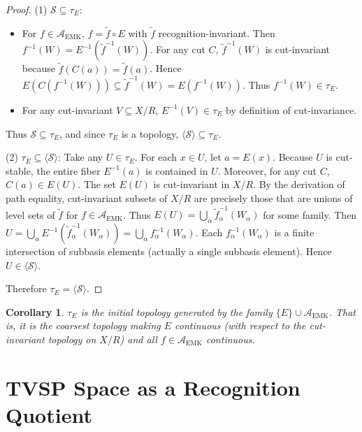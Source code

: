 \documentclass[12pt]{article}
\newtheorem{corollary}[axiom]{Corollary}
\newcommand{\EMK}{\mathrm{EMK}}
\newcommand{\A}{\mathcal{A}}
\begin{document}
\begin{proof}
(1) \(\mathcal{S} \subseteq \tau_E\):
\begin{itemize}
    \item For \(f \in \A_{\EMK}\), \(f = \tilde{f} \circ E\) with \(\tilde{f}\) recognition-invariant.
    Then \(f^{-1}(W) = E^{-1}(\tilde{f}^{-1}(W))\).
    For any cut \(C\), \(\tilde{f}^{-1}(W)\) is cut-invariant because \(\tilde{f}(C(a)) = \tilde{f}(a)\).
    Hence \(E(C(f^{-1}(W))) \subseteq \tilde{f}^{-1}(W) = E(f^{-1}(W))\).
    Thus \(f^{-1}(W) \in \tau_E\).
    \item For any cut-invariant \(V \subseteq X/R\), \(E^{-1}(V) \in \tau_E\) by definition of cut-invariance.
\end{itemize}
Thus \(\mathcal{S} \subseteq \tau_E\), and since \(\tau_E\) is a topology, \(\langle \mathcal{S} \rangle \subseteq \tau_E\).

(2) \(\tau_E \subseteq \langle \mathcal{S} \rangle\):
Take any \(U \in \tau_E\). For each \(x \in U\), let \(a = E(x)\).
Because \(U\) is cut-stable, the entire fiber \(E^{-1}(a)\) is contained in \(U\).
Moreover, for any cut \(C\), \(C(a) \in E(U)\).
The set \(E(U)\) is cut-invariant in \(X/R\).
By the derivation of path equality, cut-invariant subsets of \(X/R\) are precisely those that are unions of level sets of \(\tilde{f}\) for \(f \in \A_{\EMK}\).
Thus \(E(U) = \bigcup_{\alpha} \tilde{f}_\alpha^{-1}(W_\alpha)\) for some family.
Then \(U = \bigcup_{\alpha} E^{-1}(\tilde{f}_\alpha^{-1}(W_\alpha)) = \bigcup_{\alpha} f_\alpha^{-1}(W_\alpha)\).
Each \(f_\alpha^{-1}(W_\alpha)\) is a finite intersection of subbasis elements (actually a single subbasis element).
Hence \(U \in \langle \mathcal{S} \rangle\).

Therefore \(\tau_E = \langle \mathcal{S} \rangle\).
\end{proof}

\begin{corollary}
\(\tau_E\) is the initial topology generated by the family \(\{E\} \cup \A_{\EMK}\).
That is, it is the coarsest topology making \(E\) continuous (with respect to the cut-invariant topology on \(X/R\)) and all \(f \in \A_{\EMK}\) continuous.
\end{corollary}

\section{TVSP Space as a Recognition Quotient}
\end{document}
